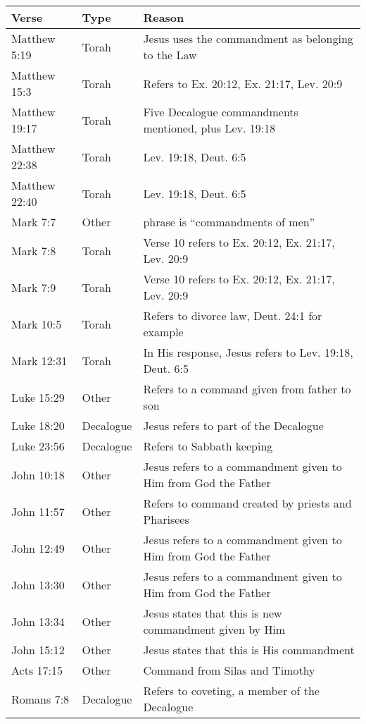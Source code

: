 \documentclass{article}
\begin{document}
\begin{table}
    \footnotesize
    \begin{tabularx}{\textwidth}{llX}
    \toprule
    Verse & Type & Reason \\
    \midrule
    Matthew 5:19 & Torah & Jesus uses the commandment as belonging to the Law \\
    Matthew 15:3 & Torah & Refers to Ex. 20:12, Ex. 21:17, Lev. 20:9 \\
    Matthew 19:17 & Torah & Five Decalogue commandments mentioned, plus Lev. 19:18 \\
    Matthew 22:38 & Torah & Lev. 19:18, Deut. 6:5\\
    Matthew 22:40 & Torah & Lev. 19:18, Deut. 6:5\\
    Mark 7:7 & Other & phrase is ``commandments of men'' \\
    Mark 7:8 & Torah & Verse 10 refers to Ex. 20:12, Ex. 21:17, Lev. 20:9\\
    Mark 7:9 & Torah & Verse 10 refers to Ex. 20:12, Ex. 21:17, Lev. 20:9\\
    Mark 10:5 & Torah & Refers to divorce law, Deut. 24:1 for example\\
    Mark 12:31 & Torah & In His response, Jesus refers to Lev. 19:18, Deut. 6:5\\
    Luke 15:29 & Other & Refers to a command given from father to son\\
    Luke 18:20 & Decalogue & Jesus refers to part of the Decalogue\\
    Luke 23:56 & Decalogue & Refers to Sabbath keeping\\
    John 10:18 & Other & Jesus refers to a commandment given to Him from God the Father\\
    John 11:57 & Other & Refers to command created by priests and Pharisees\\
    John 12:49 & Other & Jesus refers to a commandment given to Him from God the Father\\
    John 13:30 & Other & Jesus refers to a commandment given to Him from God the Father\\
    John 13:34 & Other & Jesus states that this is new commandment given by Him\\
    John 15:12 & Other & Jesus states that this is His commandment\\
    Acts 17:15 & Other & Command from Silas and Timothy\\
    Romans 7:8 & Decalogue & Refers to coveting, a member of the Decalogue\\

\end{tabularx}
\end{table}
\end{document}
